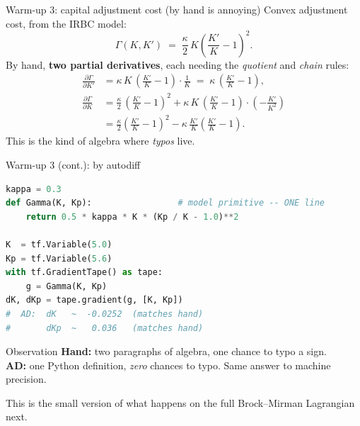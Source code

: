 \documentclass[aspectratio=169,11pt]{beamer}
\newcommand{\emphc}[1]{\textcolor{harvardcrimson}{#1}}
\begin{document}
\begin{frame}[fragile]{Warm-up 3: capital adjustment cost (by hand is annoying)}
\small Convex adjustment cost, from the IRBC model:
\[
\Gamma(K, K') \;=\; \frac{\kappa}{2}\, K \left(\frac{K'}{K} - 1\right)^2.
\]
By hand, \textbf{two partial derivatives}, each needing the \emph{quotient} and \emph{chain} rules:
\begin{align*}
\tfrac{\partial \Gamma}{\partial K'} &= \kappa\,K\,\left(\tfrac{K'}{K}-1\right)\cdot \tfrac{1}{K} \;=\; \kappa\,\left(\tfrac{K'}{K}-1\right),\\
\tfrac{\partial \Gamma}{\partial K} &= \tfrac{\kappa}{2}\,\left(\tfrac{K'}{K}-1\right)^2
 + \kappa\,K\,\left(\tfrac{K'}{K}-1\right)\cdot\left(-\tfrac{K'}{K^2}\right)\\
 &= \tfrac{\kappa}{2}\left(\tfrac{K'}{K}-1\right)^2 - \kappa\,\tfrac{K'}{K}\left(\tfrac{K'}{K}-1\right).
\end{align*}
This is the kind of algebra where \emph{typos} live.
\end{frame}

\begin{frame}[fragile]{Warm-up 3 (cont.): by autodiff}
\small
\begin{lstlisting}[language=Python,basicstyle=\ttfamily\scriptsize]
kappa = 0.3
def Gamma(K, Kp):                 # model primitive -- ONE line
    return 0.5 * kappa * K * (Kp / K - 1.0)**2

K  = tf.Variable(5.0)
Kp = tf.Variable(5.6)
with tf.GradientTape() as tape:
    g = Gamma(K, Kp)
dK, dKp = tape.gradient(g, [K, Kp])
#  AD:  dK   ~  -0.0252  (matches hand)
#       dKp  ~   0.036   (matches hand)
\end{lstlisting}
\vspace{-2pt}
\begin{block}{Observation}
\small
\textbf{Hand:} two paragraphs of algebra, one chance to typo a sign. \\
\textbf{AD:} one Python definition, \emph{zero} chances to typo. Same answer to machine precision.
\end{block}
\centerline{\emphc{This is the small version of what happens on the full Brock--Mirman Lagrangian next.}}
\end{frame}
\end{document}
